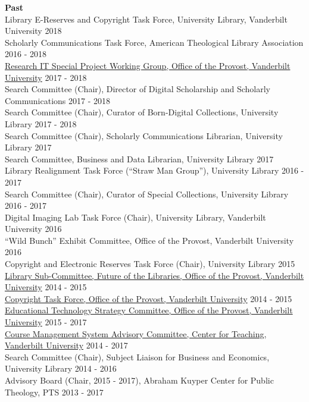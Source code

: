 \documentclass[10pt]{res} %
\begin{document}
\begin{resume}
{\bf Past} \\
Library E-Reserves and Copyright Task Force, University Library, Vanderbilt University \hfill 2018 \\
Scholarly Communications Task Force, American Theological Library Association \hfill 2016 - 2018 \\
\href{https://news.vanderbilt.edu/2017/03/17/new-working-group-to-assess-and-prioritize-opportunities-for-enhancing-research-it-resources-on-campus/}{Research IT Special Project Working Group, Office of the Provost, Vanderbilt University} \hfill 2017 - 2018 \\
Search Committee (Chair), Director of Digital Scholarship and Scholarly Communications \hfill 2017 - 2018 \\
Search Committee (Chair), Curator of Born-Digital Collections, University Library \hfill 2017 - 2018 \\
Search Committee (Chair), Scholarly Communications Librarian, University Library \hfill 2017 \\
Search Committee, Business and Data Librarian, University Library \hfill 2017 \\
Library Realignment Task Force (“Straw Man Group”), University Library \hfill 2016 - 2017 \\
Search Committee (Chair), Curator of Special Collections, University Library \hfill 2016 - 2017 \\
Digital Imaging Lab Task Force (Chair), University Library, Vanderbilt University \hfill 2016 \\
“Wild Bunch” Exhibit Committee, Office of the Provost, Vanderbilt University \hfill 2016 \\
Copyright and Electronic Reserves Task Force (Chair), University Library \hfill 2015 \\
\href{https://www.library.vanderbilt.edu/future/}{Library Sub-Committee, Future of the Libraries, Office of the Provost, Vanderbilt University} \hfill 2014 - 2015 \\
\href{http://news.vanderbilt.edu/2015/09/new-videos-on-copyright-law-help-users- balance-fair-use-considerations/}{Copyright Task Force, Office of the Provost, Vanderbilt University} \hfill 2014 - 2015 \\
\href{https://www.vanderbilt.edu/provost/committees/edtechstrategy.php}{Educational Technology Strategy Committee, Office of the Provost, Vanderbilt University} \hfill 2015 - 2017 \\
\href{https://www.vanderbilt.edu/blackboard/about/advisory-committee/}{Course Management System Advisory Committee, Center for Teaching, Vanderbilt University} \hfill 2014 - 2017 \\
Search Committee (Chair), Subject Liaison for Business and Economics, University Library \hfill 2014 - 2016 \\
Advisory Board (Chair, 2015 - 2017), Abraham Kuyper Center for Public Theology, PTS \hfill 2013 - 2017


\end{resume}
\end{document}
